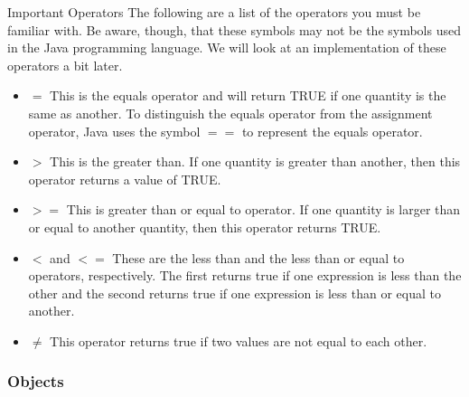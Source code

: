 	\begin{positiveInformation}{Important Operators}
		The following are a list of the operators you must be familiar with. Be aware, though, that these symbols may not be the symbols used in the Java programming language. We will look at an implementation of these operators a bit later.
			\begin{itemize}
				\item $=$ This is the equals operator and will return TRUE if one quantity is the same as another. To distinguish the equals operator from the assignment operator, Java uses the symbol $==$ to represent the equals operator.
				\item $>$ This is the greater than. If one quantity is greater than another, then this operator returns a value of TRUE.
				\item $>=$ This is greater than or equal to operator. If one quantity is larger than or equal to another quantity, then this operator returns TRUE.
				\item $<$ and $<=$ These are the less than and the less than or equal to operators, respectively. The first returns true if one expression is less than the other and the second returns true if one expression is less than or equal to another.
				\item $\neq$ This operator returns true if two values are not equal to each other.
			\end{itemize}
	\end{positiveInformation}
\subsubsection*{Objects}


